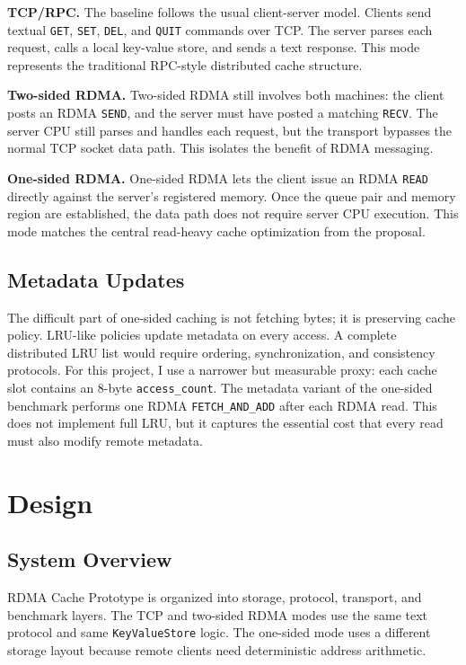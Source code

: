 \documentclass[letterpaper,twocolumn,10pt]{article}
\newcommand{\sys}{RDMA Cache Prototype}
\begin{document}
\textbf{TCP/RPC.}
The baseline follows the usual client-server model.  Clients send textual
\texttt{GET}, \texttt{SET}, \texttt{DEL}, and \texttt{QUIT} commands over TCP.
The server parses each request, calls a local key-value store, and sends a
text response.  This mode represents the traditional RPC-style distributed
cache structure.

\textbf{Two-sided RDMA.}
Two-sided RDMA still involves both machines: the client posts an RDMA
\texttt{SEND}, and the server must have posted a matching \texttt{RECV}.  The
server CPU still parses and handles each request, but the transport bypasses
the normal TCP socket data path.  This isolates the benefit of RDMA messaging.

\textbf{One-sided RDMA.}
One-sided RDMA lets the client issue an RDMA \texttt{READ} directly against
the server's registered memory.  Once the queue pair and memory region are
established, the data path does not require server CPU execution.  This mode
matches the central read-heavy cache optimization from the proposal.

\subsection{Metadata Updates}

The difficult part of one-sided caching is not fetching bytes; it is preserving
cache policy.  LRU-like policies update metadata on every access.  A complete
distributed LRU list would require ordering, synchronization, and consistency
protocols.  For this project, I use a narrower but measurable proxy: each
cache slot contains an 8-byte \texttt{access\_count}.  The metadata variant of
the one-sided benchmark performs one RDMA \texttt{FETCH\_AND\_ADD} after each
RDMA read.  This does not implement full LRU, but it captures the essential
cost that every read must also modify remote metadata.

\section{Design}

\subsection{System Overview}

\sys{} is organized into storage, protocol, transport, and benchmark layers.
The TCP and two-sided RDMA modes use the same text protocol and same
\texttt{KeyValueStore} logic.  The one-sided mode uses a different storage
layout because remote clients need deterministic address arithmetic.
\end{document}
